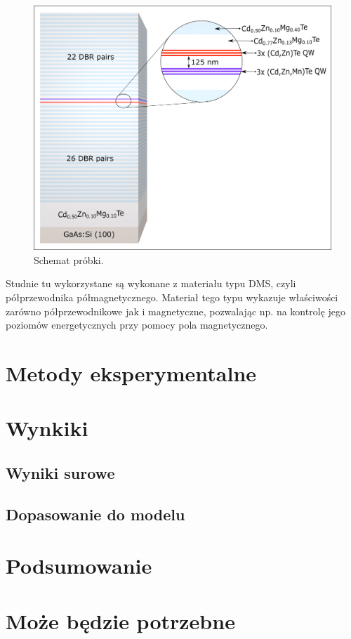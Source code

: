\documentclass[licencjacka]{pracamgr}
\begin{document}
\begin{figure}[h!]
\includegraphics[width=13cm]{Probka} 
\centering
\caption{Schemat próbki.}
\end{figure}

Studnie tu wykorzystane są wykonane z materiału typu DMS, czyli półprzewodnika półmagnetycznego. Materiał tego typu wykazuje właściwości zarówno półprzewodnikowe jak i magnetyczne, pozwalając np. na kontrolę jego poziomów energetycznych przy pomocy pola magnetycznego.

\chapter{Metody eksperymentalne}\label{r:metody}



\chapter{Wynkiki}\label{r:wyniki}
\section{Wyniki surowe}
\section{Dopasowanie do modelu}




\chapter{Podsumowanie}


\appendix

\chapter{Może będzie potrzebne}



\end{document}
